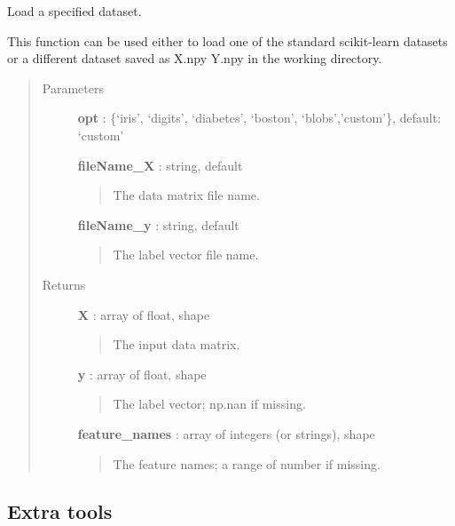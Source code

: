 \documentclass[letterpaper,10pt,english]{sphinxmanual}
\begin{document}
\begin{fulllineitems}
\label{index:adenine.utils.data_source.load}
Load a specified dataset.

This function can be used either to load one of the standard scikit-learn datasets or a different dataset saved as X.npy Y.npy in the working directory.
\begin{quote}\begin{description}
\item[{Parameters}] \leavevmode
\textbf{opt} : \{`iris', `digits', `diabetes', `boston', `blobs','custom'\}, default: `custom'

\textbf{fileName\_X} : string, default
\begin{quote}

The data matrix file name.
\end{quote}

\textbf{fileName\_y} : string, default
\begin{quote}

The label vector file name.
\end{quote}

\item[{Returns}] \leavevmode
\textbf{X} : array of float, shape
\begin{quote}

The input data matrix.
\end{quote}

\textbf{y} : array of float, shape
\begin{quote}

The label vector; np.nan if missing.
\end{quote}

\textbf{feature\_names} : array of integers (or strings), shape
\begin{quote}

The feature names; a range of number if missing.
\end{quote}

\end{description}\end{quote}

\end{fulllineitems}



\subsection{Extra tools}
\label{index:extra-tools}\label{index:module-adenine.utils.extra}
\end{document}
